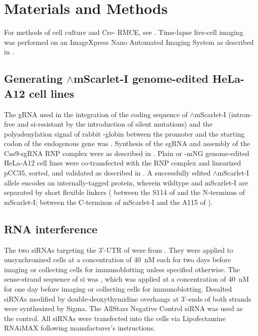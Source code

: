 \section{Materials and Methods}
For methods of cell culture and Cre- RMCE, see . Time-lapse live-cell imaging was performed on an ImageXpress Nano Automated Imaging System as described in .

\subsection{Generating $\wedge$mScarlet-I genome-edited HeLa-A12 cell lines}

The gRNA used in the integration of the coding sequence of $\wedge$mScarlet-I (intron-free and si-resistant by the introduction of silent mutations) and the polyadenylation signal of rabbit \textbeta{}-globin between the promoter and the starting codon of the endogenous  gene was . Synthesis of the sgRNA and assembly of the Cas9-sgRNA RNP complex were as described in . Plain or -mNG genome-edited HeLa-A12 cell lines were co-transfected with the RNP complex and linearized pCC35, sorted, and validated as described in . A successfully edited $\wedge$mScarlet-I allele encodes an internally-tagged  protein, wherein wildtype  and mScarlet-I are separated by short flexible linkers ( between the S114 of  and the N-terminus of mScarlet-I;  between the C-terminus of mScarlet-I and the A115 of ).


\subsection{RNA interference}

The two siRNAs targeting the 3'-UTR of  were from \cite{siMAD1-3UTR}. They were applied to unsynchronized cells at a concentration of \SI{40}{nM} each for two days before imaging or collecting cells for immunoblotting unless specified otherwise. The sense-strand sequence of si was  \cite{BubR1MitosisTurnover}, which was applied at a concentration of \SI{40}{nM} for one day before imaging or collecting cells for immunoblotting. Desalted siRNAs modified by double-deoxythymidine overhangs at 3'-ends of both strands were synthesized by Sigma. The AllStars Negative Control siRNA was used as the control. All siRNAs were transfected into the cells via Lipofectamine RNAiMAX following manufacturer’s instructions.

